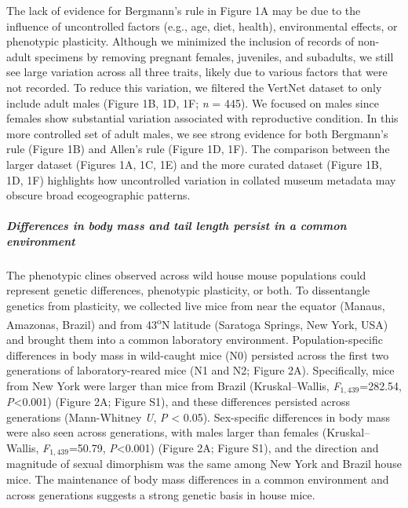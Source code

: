 \documentclass[]{article}
\let\oldsubparagraph\subparagraph
\renewcommand{\subparagraph}[1]{\oldsubparagraph{#1}\mbox{}}
\begin{document}
The lack of evidence for Bergmann's rule in Figure 1A may be due to the
influence of uncontrolled factors (e.g., age, diet, health),
environmental effects, or phenotypic plasticity. Although we minimized
the inclusion of records of non-adult specimens by removing pregnant
females, juveniles, and subadults, we still see large variation across
all three traits, likely due to various factors that were not recorded.
To reduce this variation, we filtered the VertNet dataset to only
include adult males (Figure 1B, 1D, 1F; \emph{n} = 445). We focused on
males since females show substantial variation associated with
reproductive condition. In this more controlled set of adult males, we
see strong evidence for both Bergmann's rule (Figure 1B) and Allen's
rule (Figure 1D, 1F). The comparison between the larger dataset (Figures
1A, 1C, 1E) and the more curated dataset (Figure 1B, 1D, 1F) highlights
how uncontrolled variation in collated museum metadata may obscure broad
ecogeographic patterns.

\vspace{2.5mm}

\hypertarget{differences-in-body-mass-and-tail-length-persist-in-a-common-environment}{%
\subparagraph{\texorpdfstring{\emph{Differences in body mass and tail
length persist in a common
environment}}{Differences in body mass and tail length persist in a common environment}}\label{differences-in-body-mass-and-tail-length-persist-in-a-common-environment}}

The phenotypic clines observed across wild house mouse populations could
represent genetic differences, phenotypic plasticity, or both. To
dissentangle genetics from plasticity, we collected live mice from near
the equator (Manaus, Amazonas, Brazil) and from 43\textsuperscript{o}N
latitude (Saratoga Springs, New York, USA) and brought them into a
common laboratory environment. Population-specific differences in body
mass in wild-caught mice (N0) persisted across the first two generations
of laboratory-reared mice (N1 and N2; Figure 2A). Specifically, mice
from New York were larger than mice from Brazil (Kruskal--Wallis,
\emph{F}\(_{1,439}\)=282.54, \emph{P}\textless{}0.001) (Figure 2A;
Figure S1), and these differences persisted across generations
(Mann-Whitney \emph{U}, \emph{P} \textless{} 0.05). Sex-specific
differences in body mass were also seen across generations, with males
larger than females (Kruskal--Wallis, \emph{F}\(_{1,439}\)=50.79,
\emph{P}\textless{}0.001) (Figure 2A; Figure S1), and the direction and
magnitude of sexual dimorphism was the same among New York and Brazil
house mice. The maintenance of body mass differences in a common
environment and across generations suggests a strong genetic basis in
house mice.
\end{document}
